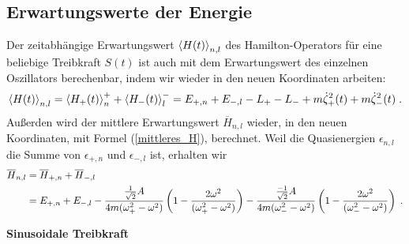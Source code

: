  \subsection{Erwartungswerte der Energie}
    Der zeitabhängige Erwartungswert $\braket{H(t)}_{n,l}$ des Hamilton-Operators für eine beliebige Treibkraft $S(t)$ ist auch mit dem Erwartungswert des einzelnen Oszillators berechenbar, indem wir wieder in den neuen Koordinaten arbeiten:
    \begin{align}
      \braket{H(t)}_{n,l} = \braket{H_+(t)}_n^+ + \braket{H_-(t)}_l^- %
      = E_{+,n}+E_{-,l} -L_+-L_- +m\dot\zeta_+^2(t)+m\dot\zeta_-^2(t) \; .
    \end{align}
    Außerden wird der mittlere Erwartungswert $\overline{H}_{n,l}$ wieder, in den neuen Koordinaten, mit Formel (\ref{mittleres_H}), berechnet.
    Weil die Quasienergien $\epsilon_{n,l}$ die Summe von $\epsilon_{+,n}$ und $\epsilon_{-,l}$ ist, erhalten wir
    \begin{align}
      \overline{H}_{n,l}&=\overline{H}_{+,n}+\overline{H}_{-,l}  \notag\\
      &=E_{+,n}+E_{-,l} - \frac{\frac{1}{\sqrt 2} A}{4m(\omega_+^2-\omega^2)}\left(1-\frac{2\omega^2}{(\omega_+^2-\omega^2)}\right)
      - \frac{\frac{-1}{\sqrt 2} A}{4m(\omega_-^2-\omega^2)}\left(1-\frac{2\omega^2}{(\omega_-^2-\omega^2)}\right) \; .
      \label{mittleres_H_gekoppelt}
    \end{align}

    \textbf{Sinusoidale Treibkraft}

